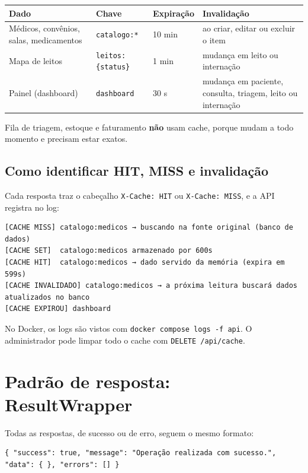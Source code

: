 \documentclass[12pt,a4paper]{article}
\newcommand{\cod}[1]{\texttt{#1}}
\begin{document}
\begin{tabularx}{\textwidth}{@{}lllL@{}}
\toprule
\textbf{Dado} & \textbf{Chave} & \textbf{Expiração} & \textbf{Invalidação} \\
\midrule
Médicos, convênios, salas, medicamentos & \cod{catalogo:*}        & 10 min & ao criar, editar ou excluir o item \\
Mapa de leitos                          & \cod{leitos:\{status\}} & 1 min  & mudança em leito ou internação \\
Painel (dashboard)                      & \cod{dashboard}         & 30 s   & mudança em paciente, consulta, triagem, leito ou internação \\
\bottomrule
\end{tabularx}

\medskip
Fila de triagem, estoque e faturamento \textbf{não} usam cache, porque mudam a todo momento e
precisam estar exatos.

\subsection{Como identificar HIT, MISS e invalidação}

Cada resposta traz o cabeçalho \cod{X-Cache: HIT} ou \cod{X-Cache: MISS}, e a API registra no
log:

\begin{lstlisting}
[CACHE MISS] catalogo:medicos → buscando na fonte original (banco de dados)
[CACHE SET]  catalogo:medicos armazenado por 600s
[CACHE HIT]  catalogo:medicos → dado servido da memória (expira em 599s)
[CACHE INVALIDADO] catalogo:medicos → a próxima leitura buscará dados atualizados no banco
[CACHE EXPIROU] dashboard
\end{lstlisting}

No Docker, os logs são vistos com \cod{docker compose logs -f api}. O administrador pode limpar
todo o cache com \cod{DELETE /api/cache}.

\section{Padrão de resposta: ResultWrapper}

Todas as respostas, de sucesso ou de erro, seguem o mesmo formato:

\begin{lstlisting}
{ "success": true, "message": "Operação realizada com sucesso.", "data": { }, "errors": [] }
\end{lstlisting}
\end{document}
